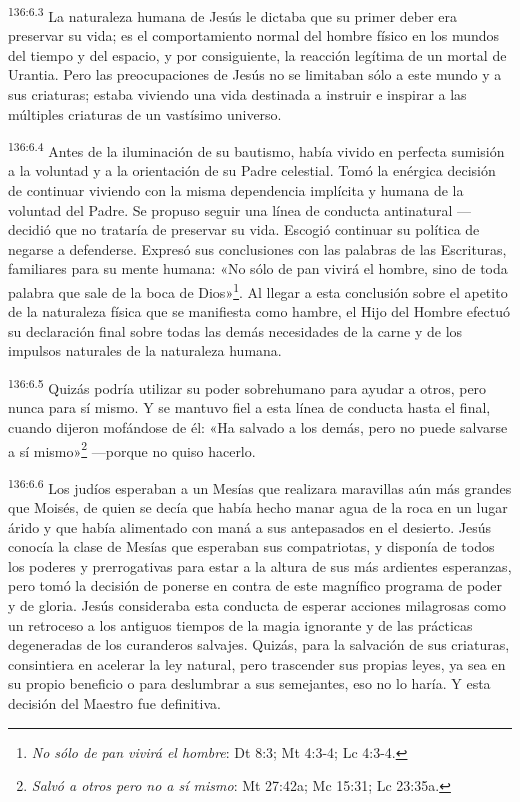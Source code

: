 \par 
\textsuperscript{136:6.3} La naturaleza humana de Jesús le dictaba que su primer deber era preservar su vida; es el comportamiento normal del hombre físico en los mundos del tiempo y del espacio, y por consiguiente, la reacción legítima de un mortal de Urantia. Pero las preocupaciones de Jesús no se limitaban sólo a este mundo y a sus criaturas; estaba viviendo una vida destinada a instruir e inspirar a las múltiples criaturas de un vastísimo universo.

\par 
\textsuperscript{136:6.4} Antes de la iluminación de su bautismo, había vivido en perfecta sumisión a la voluntad y a la orientación de su Padre celestial. Tomó la enérgica decisión de continuar viviendo con la misma dependencia implícita y humana de la voluntad del Padre. Se propuso seguir una línea de conducta antinatural ---decidió que no trataría de preservar su vida. Escogió continuar su política de negarse a defenderse. Expresó sus conclusiones con las palabras de las Escrituras, familiares para su mente humana: «No sólo de pan vivirá el hombre, sino de toda palabra que sale de la boca de Dios»\footnote{\textit{No sólo de pan vivirá el hombre}: Dt 8:3; Mt 4:3-4; Lc 4:3-4.}. Al llegar a esta conclusión sobre el apetito de la naturaleza física que se manifiesta como hambre, el Hijo del Hombre efectuó su declaración final sobre todas las demás necesidades de la carne y de los impulsos naturales de la naturaleza humana.

\par 
\textsuperscript{136:6.5} Quizás podría utilizar su poder sobrehumano para ayudar a otros, pero nunca para sí mismo. Y se mantuvo fiel a esta línea de conducta hasta el final, cuando dijeron mofándose de él: «Ha salvado a los demás, pero no puede salvarse a sí mismo»\footnote{\textit{Salvó a otros pero no a sí mismo}: Mt 27:42a; Mc 15:31; Lc 23:35a.} ---porque no quiso hacerlo.

\par 
\textsuperscript{136:6.6} Los judíos esperaban a un Mesías que realizara maravillas aún más grandes que Moisés, de quien se decía que había hecho manar agua de la roca en un lugar árido y que había alimentado con maná a sus antepasados en el desierto. Jesús conocía la clase de Mesías que esperaban sus compatriotas, y disponía de todos los poderes y prerrogativas para estar a la altura de sus más ardientes esperanzas, pero tomó la decisión de ponerse en contra de este magnífico programa de poder y de gloria. Jesús consideraba esta conducta de esperar acciones milagrosas como un retroceso a los antiguos tiempos de la magia ignorante y de las prácticas degeneradas de los curanderos salvajes. Quizás, para la salvación de sus criaturas, consintiera en acelerar la ley natural, pero trascender sus propias leyes, ya sea en su propio beneficio o para deslumbrar a sus semejantes, eso no lo haría. Y esta decisión del Maestro fue definitiva.

